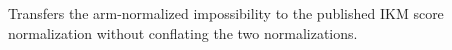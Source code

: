 Transfers the arm-normalized impossibility to the published IKM score normalization without conflating the two normalizations.